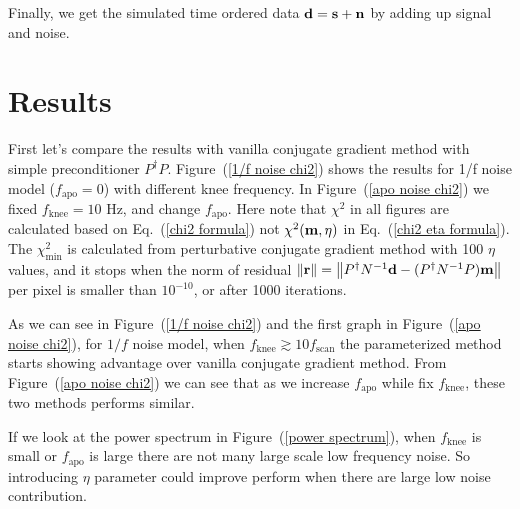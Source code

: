 \documentclass[twocolumn,linenumbers]{aastex631}
\newcommand{\vbd}{\vb{d}}
\newcommand{\vbm}{\vb{m}}
\newcommand{\inv}[1]{#1^{-1}}
\newcommand{\Pdagger}{P^{\dagger}}
\begin{document}
Finally, we get the simulated time ordered data $\vb{d} = \vb{s} + \vb{n}$ by
adding up signal and noise.



\section{Results} \label{sec:results}
First let's compare the results with vanilla conjugate gradient method with
simple preconditioner $\Pdagger P$.
Figure~(\ref{1/f noise chi2}) shows the results for 1/f noise model ($f_\text{apo}=0$)
with different knee frequency. 
In Figure~(\ref{apo noise chi2}) we fixed $f_\text{knee}=10$ Hz, and change $f_\text{apo}$.
Here note that $\chi^2$ in all figures are calculated based on
Eq.~(\ref{chi2 formula})
not $\chi^2(\vbm, \eta)$ in Eq.~(\ref{chi2 eta formula}).
The $\chi^2_{\text{min}}$ is calculated from perturbative conjugate gradient
method with 100 $\eta$ values, and it stops when the norm of residual 
$\norm{\vb{r}} = \norm{\Pdagger \inv{N}\vbd - (\Pdagger\inv{N}P) \vbm}$
per pixel is smaller than $10^{-10}$, or after 1000 iterations.

As we can see in Figure~(\ref{1/f noise chi2}) and the first graph in 
Figure~(\ref{apo noise chi2}),
for $1/f$ noise model, when $f_\text{knee} \gtrsim 10 f_\text{scan}$
the parameterized method starts showing advantage over vanilla conjugate gradient method.
From Figure~(\ref{apo noise chi2}) we can see that as we increase $f_\text{apo}$
while fix $f_\text{knee}$, these two methods performs similar.

If we look at the power spectrum in Figure~(\ref{power spectrum}),
when $f_\text{knee}$ is small or $f_\text{apo}$ is large there are not many
large scale low frequency noise.
So introducing $\eta$ parameter could improve perform when there are large low noise
contribution.
\end{document}
